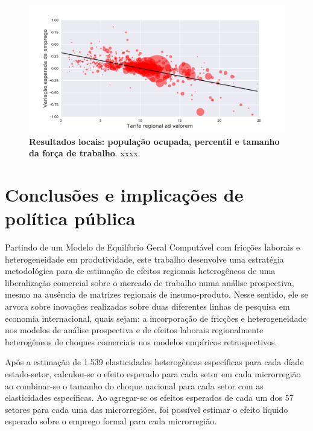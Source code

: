 \documentclass{article}
\begin{document}
\newpage

\begin{landscape}
\begin{figure}[htbp]
    \centering
    \includegraphics[scale=1]{rtr_effects.pdf}
    \caption[Resultados locais: população ocupada, percentil e tamanho da força de trabalho]{\textbf{Resultados locais: população ocupada, percentil e tamanho da força de trabalho}. xxxx.}
    \label{fig:rtr_effects}
\end{figure}
\end{landscape}

\section{Conclusões e implicações de política pública} 

Partindo de um Modelo de Equilíbrio Geral Computável com fricções laborais e heterogeneidade em produtividade, este trabalho desenvolve uma estratégia metodológica para de estimação de efeitos regionais heterogêneos de uma liberalização comercial sobre o mercado de trabalho numa análise prospectiva, mesmo na ausência de matrizes regionais de insumo-produto. Nesse sentido, ele se arvora sobre inovações realizadas sobre duas diferentes linhas de pesquisa em economia internacional, quais sejam: a incorporação de fricções e heterogeneidade nos modelos de análise prospectiva e de efeitos laborais regionalmente heterogêneos de choques comerciais nos modelos empíricos retrospectivos.

Após a estimação de 1.539 elasticidades heterogêneas específicas para cada díade estado-setor, calculou-se o efeito esperado para cada setor em cada microrregião ao combinar-se o tamanho do choque nacional para cada setor com as elasticidades específicas. Ao agregar-se os efeitos esperados de cada um dos 57 setores para cada uma das microrregiões, foi possível estimar o efeito líquido esperado sobre o emprego formal para cada microrregião.
\end{document}
